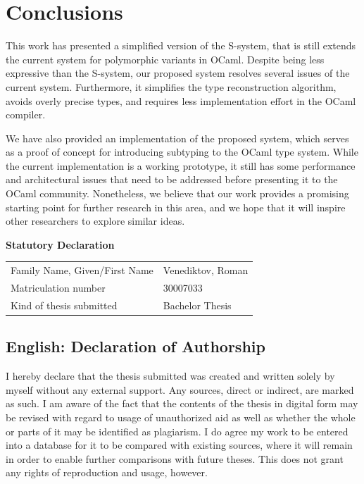 \documentclass[a4paper,11pt,oneside]{article}
\theoremstyle{definition}
\newcommand{\mylastname}{Venediktov}
\newcommand{\myfirstname}{Roman}
\newcommand{\mynumber}{30007033}
\begin{document}
\section{Conclusions}

This work has presented a simplified version of the S-system\cite{Castagna_2016},
that is still extends the current system for polymorphic variants in OCaml.
Despite being less expressive than the S-system, our proposed system resolves
several issues of the current system. Furthermore, it simplifies the type
reconstruction algorithm, avoids overly precise types, and requires less
implementation effort in the OCaml compiler.

We have also provided an implementation of the proposed system, which serves
as a proof of concept for introducing subtyping to the OCaml type system.
While the current implementation is a working prototype, it still has some
performance and architectural issues that need to be addressed before
presenting it to the OCaml community. Nonetheless, we believe that our work
provides a promising starting point for further research in this area, and
we hope that it will inspire other researchers to explore similar ideas.

\newpage

\printbibliography

\newpage
\thispagestyle{empty}

\begin{center}
  \Large \textbf{Statutory Declaration}
  \vspace*{8mm}
\end{center}

\begin{center}
  \begin{tabular}{|l|p{85mm}|}
    \hline
    Family Name, Given/First Name & \mylastname, \myfirstname \\
    Matriculation number          & \mynumber                 \\
    Kind of thesis submitted      & Bachelor Thesis           \\
    \hline
  \end{tabular}
  \vspace*{8mm}
\end{center}

\subsection*{English: Declaration of Authorship}

I hereby declare that the thesis submitted was created and written
solely by myself without any external support. Any sources, direct
or indirect, are marked as such. I am aware of the fact that the
contents of the thesis in digital form may be revised with regard to
usage of unauthorized aid as well as whether the whole or parts of
it may be identified as plagiarism. I do agree my work to be entered
into a database for it to be compared with existing sources, where
it will remain in order to enable further comparisons with future
theses. This does not grant any rights of reproduction and usage,
however.
\end{document}
